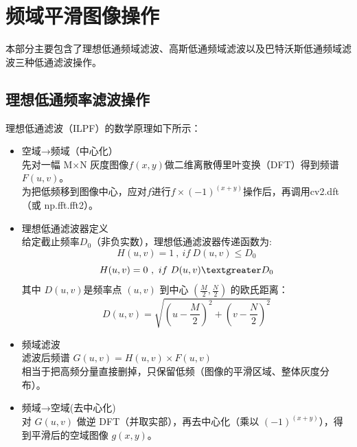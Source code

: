 \documentclass[11pt]{article}
\begin{document}
    \newpage

    
    \section{频域平滑图像操作}
    本部分主要包含了理想低通频域滤波、高斯低通频域滤波以及巴特沃斯低通频域滤波三种低通滤波操作。
    \subsection{理想低通频率滤波操作}
    理想低通滤波（ILPF）的数学原理如下所示：
    \begin{itemize}
    	\item   空域→频域（中心化）\\
    	先对一幅 M×N 灰度图像$f(x,y)$做二维离散傅里叶变换（DFT）得到频谱$F(u,v)$。\\
    	为把低频移到图像中心，应对$f$进行$f\times(−1)^{(x+y)}$操作后，再调用cv2.dft（或 np.fft.fft2）。
    	\item 理想低通滤波器定义\\
    	给定截止频率$D_0$（非负实数），理想低通滤波器传递函数为:
    	$$H(u,v) = 1\ , \  if\  D(u,v) \leq D_0$$
    	$$H(u,v) = 0\ ,  \  if\  D(u,v) \textgreater D_0$$
    	其中 $D(u,v)$是频率点 $(u,v)$ 到中心 $(\frac{M}{2}, \frac{N}{2})$ 的欧氏距离：\\
    	$$D(u,v) = \sqrt{{(u−\frac{M}{2})^2 + (v−\frac{N}{2})^2}}$$
    	\item 频域滤波\\
    	滤波后频谱 $G(u,v) = H(u,v) \times F(u,v)$\\
    	相当于把高频分量直接删掉，只保留低频（图像的平滑区域、整体灰度分布）。
    	\item 频域→空域(去中心化)\\
    	对 $G(u,v)$ 做逆 DFT（并取实部），再去中心化（乘以 $(−1)^{(x+y)}$），得到平滑后的空域图像 $g(x,y)$。
    \end{itemize}
\end{document}
